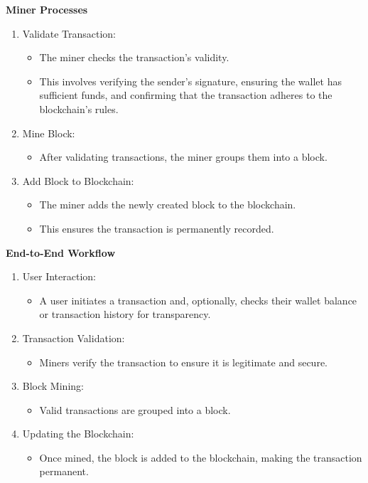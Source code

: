 \documentclass[12pt,a4paper]{report}
\begin{document}
\textbf{Miner Processes}
\begin{enumerate}
    \item Validate Transaction:
        \begin{itemize}
        \item The miner checks the transaction's validity.
        \item This involves verifying the sender's signature, ensuring the wallet has sufficient funds, and confirming that the transaction adheres to the blockchain's rules.
        \end{itemize}
    
    \item Mine Block:
        \begin{itemize}
        \item After validating transactions, the miner groups them into a block.
        \end{itemize}
        
    \item Add Block to Blockchain:
        \begin{itemize}
        \item The miner adds the newly created block to the blockchain.
        \item This ensures the transaction is permanently recorded.
        \end{itemize}
\end{enumerate}
\textbf{End-to-End Workflow}


\begin{enumerate}
    \item User Interaction:
        \begin{itemize}
        \item A user initiates a transaction and, optionally, checks their wallet balance or transaction history for transparency.
        \end{itemize}
    
    \item Transaction Validation:
        \begin{itemize}
        \item Miners verify the transaction to ensure it is legitimate and secure.
        \end{itemize}
        
    \item Block Mining:
        \begin{itemize}
        \item Valid transactions are grouped into a block.
        \end{itemize}

    \item Updating the Blockchain:
        \begin{itemize}
        \item Once mined, the block is added to the blockchain, making the transaction permanent.
        \end{itemize}
\end{enumerate}
\end{document}
